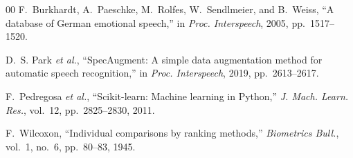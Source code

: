 \documentclass[conference]{IEEEtran}
\begin{document}
\begin{thebibliography}{00}
F.~Burkhardt, A.~Paeschke, M.~Rolfes, W.~Sendlmeier, and B.~Weiss, ``A database of German emotional speech,'' in \textit{Proc. Interspeech}, 2005, pp.~1517--1520.

D.~S. Park \textit{et al.}, ``SpecAugment: A simple data augmentation method for automatic speech recognition,'' in \textit{Proc. Interspeech}, 2019, pp.~2613--2617.

F.~Pedregosa \textit{et al.}, ``Scikit-learn: Machine learning in Python,'' \textit{J. Mach. Learn. Res.}, vol.~12, pp.~2825--2830, 2011.

F.~Wilcoxon, ``Individual comparisons by ranking methods,'' \textit{Biometrics Bull.}, vol.~1, no.~6, pp.~80--83, 1945.

\end{thebibliography}
\end{document}
